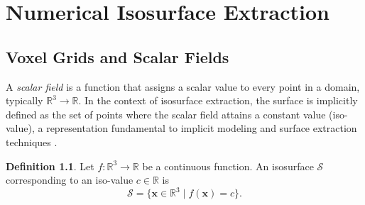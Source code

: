 \documentclass[12pt, a4paper, oneside]{book}
\theoremstyle{plain}
\newtheorem{theorem}{Theorem}[chapter]
\theoremstyle{definition}
\newtheorem{definition}[theorem]{Definition}
\theoremstyle{remark}
\theoremstyle{definition}
\begin{document}

\chapter{Numerical Isosurface Extraction}
\section{Voxel Grids and Scalar Fields}

A \emph{scalar field} is a function that assigns a scalar value to every point in a domain, typically $\mathbb{R}^3 \rightarrow \mathbb{R}$. In the context of isosurface extraction, the surface is implicitly defined as the set of points where the scalar field attains a constant value (iso-value), a representation fundamental to implicit modeling and surface extraction techniques \cite{bloomenthal1997introduction}.

\begin{definition}
Let $f:\mathbb{R}^3 \rightarrow \mathbb{R}$ be a continuous function. An isosurface $\mathcal{S}$ corresponding to an iso-value $c \in \mathbb{R}$ is
\[
\mathcal{S} = \{ \mathbf{x} \in \mathbb{R}^3 \mid f(\mathbf{x}) = c \}.
\]
\end{definition}
\end{document}

